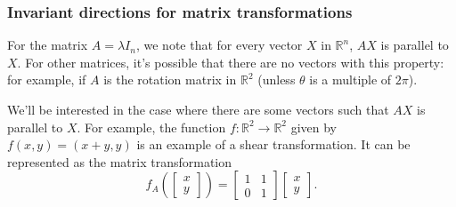 \documentclass[11pt,t]{beamer}
\newcommand{\R}{\mathbb{R}}
\begin{document}
\begin{frame}
\frametitle{Invariant directions for matrix transformations}

For the matrix $A = \lambda I_n$, we note that for every vector $X$ in $\R^n$, $AX$ is parallel to $X$. For other matrices, it's possible that there are \alert{no} vectors with this property: for example, if $A$ is the rotation matrix in $\R^2$ (unless $\theta$ is a multiple of $2\pi$).

\bigskip

We'll be interested in the case where there are \alert{some} vectors such that $AX$ is parallel to $X$. For example, the function $f:\R^2\to \R^2$ given by $f(x,y) = (x+y,y)$ is an example of a \alert{shear transformation}. It can be represented as the matrix transformation
\[
f_A\left(\begin{bmatrix}x\\y\end{bmatrix}\right) = \begin{bmatrix}1&1\\0&1\end{bmatrix}\begin{bmatrix}
x\\y
\end{bmatrix}.
\]
\end{frame}
\end{document}

